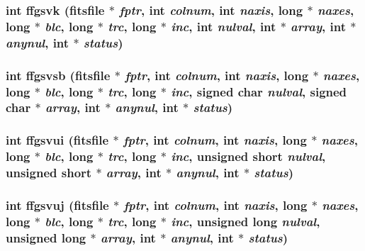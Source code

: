 \subsubsection{\setlength{\rightskip}{0pt plus 5cm}int ffgsvk (\bf{fitsfile} $\ast$ {\em fptr}, int {\em colnum}, int {\em naxis}, long $\ast$ {\em naxes}, long $\ast$ {\em blc}, long $\ast$ {\em trc}, long $\ast$ {\em inc}, int {\em nulval}, int $\ast$ {\em array}, int $\ast$ {\em anynul}, int $\ast$ {\em status})}\label{test_2roimasker_2fitsio_8h_af5457b13c2e0db0be99a6dd61c025dc}


\subsubsection{\setlength{\rightskip}{0pt plus 5cm}int ffgsvsb (\bf{fitsfile} $\ast$ {\em fptr}, int {\em colnum}, int {\em naxis}, long $\ast$ {\em naxes}, long $\ast$ {\em blc}, long $\ast$ {\em trc}, long $\ast$ {\em inc}, signed char {\em nulval}, signed char $\ast$ {\em array}, int $\ast$ {\em anynul}, int $\ast$ {\em status})}\label{test_2roimasker_2fitsio_8h_9b640c1b98ee1cca47986fc97e10171e}


\subsubsection{\setlength{\rightskip}{0pt plus 5cm}int ffgsvui (\bf{fitsfile} $\ast$ {\em fptr}, int {\em colnum}, int {\em naxis}, long $\ast$ {\em naxes}, long $\ast$ {\em blc}, long $\ast$ {\em trc}, long $\ast$ {\em inc}, unsigned short {\em nulval}, unsigned short $\ast$ {\em array}, int $\ast$ {\em anynul}, int $\ast$ {\em status})}\label{test_2roimasker_2fitsio_8h_87ccfd30c50f2289bde69e5d88519f19}


\subsubsection{\setlength{\rightskip}{0pt plus 5cm}int ffgsvuj (\bf{fitsfile} $\ast$ {\em fptr}, int {\em colnum}, int {\em naxis}, long $\ast$ {\em naxes}, long $\ast$ {\em blc}, long $\ast$ {\em trc}, long $\ast$ {\em inc}, unsigned long {\em nulval}, unsigned long $\ast$ {\em array}, int $\ast$ {\em anynul}, int $\ast$ {\em status})}\label{test_2roimasker_2fitsio_8h_5216e5258326fde9ddb6bc20a82e1070}



